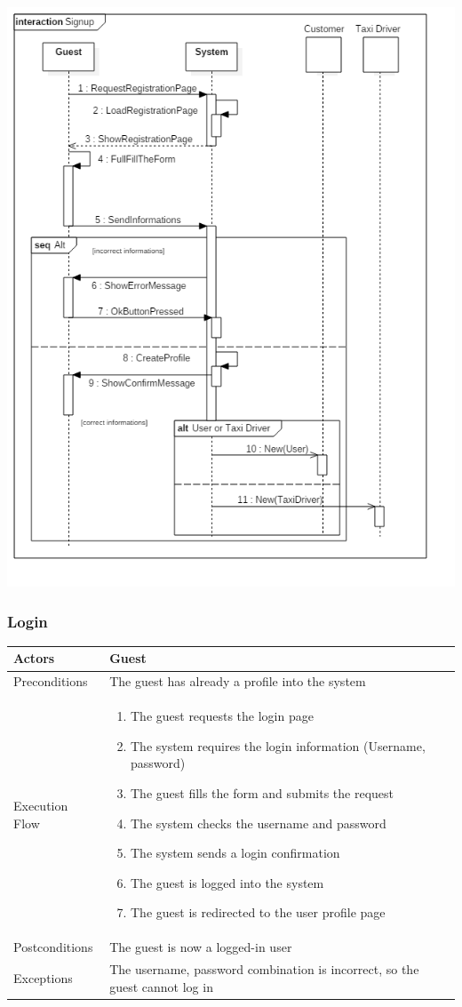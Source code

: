 \documentclass[english]{article}
\providecommand{\tabularnewline}{\\}
\begin{document}
\includegraphics[width=\textwidth]{Signup}


\subsubsection{Login}

\begin{tabular}{lp{8cm}}
\hline 
Actors  & Guest \tabularnewline
\hline 
Preconditions  & The guest has already a profile into the system\tabularnewline
\hline 
Execution Flow  & \begin{enumerate}
\item The guest requests the login page 
\item The system requires the login information (Username, password) 
\item The guest fills the form and submits the request 
\item The system checks the username and password 
\item The system sends a login confirmation 
\item The guest is logged into the system 
\item The guest is redirected to the user profile page \end{enumerate}
\tabularnewline
\hline 
Postconditions  & The guest is now a logged-in user\tabularnewline
\hline 
Exceptions  & The username, password combination is incorrect, so the guest cannot
log in \tabularnewline
\end{tabular}
\end{document}
